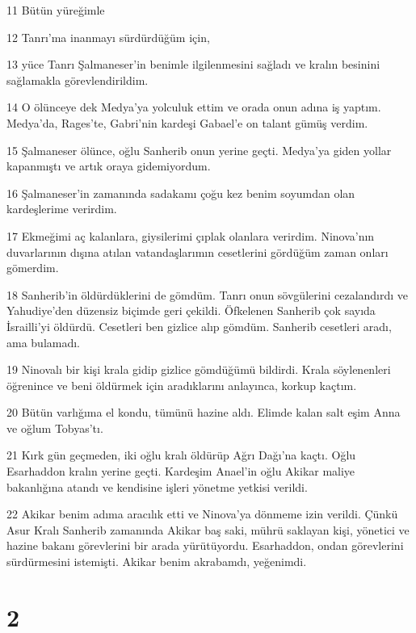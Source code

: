 \par 11 Bütün yüreğimle 
\par 12 Tanrı'ma inanmayı sürdürdüğüm için,
\par 13 yüce Tanrı Şalmaneser'in benimle ilgilenmesini sağladı ve kralın besinini sağlamakla görevlendirildim.
\par 14 O ölünceye dek Medya'ya yolculuk ettim ve orada onun adına iş yaptım. Medya'da, Rages'te, Gabri'nin kardeşi Gabael'e on talant gümüş verdim.
\par 15 Şalmaneser ölünce, oğlu Sanherib onun yerine geçti. Medya'ya giden yollar kapanmıştı ve artık oraya gidemiyordum.
\par 16 Şalmaneser'in zamanında sadakamı çoğu kez benim soyumdan olan kardeşlerime verirdim.
\par 17 Ekmeğimi aç kalanlara, giysilerimi çıplak olanlara verirdim. Ninova'nın duvarlarının dışına atılan vatandaşlarımın cesetlerini gördüğüm zaman onları gömerdim.
\par 18 Sanherib'in öldürdüklerini de gömdüm. Tanrı onun sövgülerini cezalandırdı ve Yahudiye'den düzensiz biçimde geri çekildi. Öfkelenen Sanherib çok sayıda İsrailli'yi öldürdü. Cesetleri ben gizlice alıp gömdüm. Sanherib cesetleri aradı, ama bulamadı.
\par 19 Ninovalı bir kişi krala gidip gizlice gömdüğümü bildirdi. Krala söylenenleri öğrenince ve beni öldürmek için aradıklarını anlayınca, korkup kaçtım.
\par 20 Bütün varlığıma el kondu, tümünü hazine aldı. Elimde kalan salt eşim Anna ve oğlum Tobyas'tı.
\par 21 Kırk gün geçmeden, iki oğlu kralı öldürüp Ağrı Dağı'na kaçtı. Oğlu Esarhaddon kralın yerine geçti. Kardeşim Anael'in oğlu Akikar maliye bakanlığına atandı ve kendisine işleri yönetme yetkisi verildi.
\par 22 Akikar benim adıma aracılık etti ve Ninova'ya dönmeme izin verildi. Çünkü Asur Kralı Sanherib zamanında Akikar baş saki, mührü saklayan kişi, yönetici ve hazine bakanı görevlerini bir arada yürütüyordu. Esarhaddon, ondan görevlerini sürdürmesini istemişti. Akikar benim akrabamdı, yeğenimdi.

\chapter{2}

